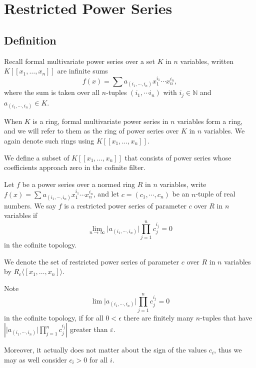 \chapter{Restricted Power Series}

\section{Definition}

Recall formal multivariate power series over a set $K$ in $n$ variables, written
$K [ \! [ x_1, \dots, x_n ] \! ]$ are infinite sums
\[
  f(x) = \sum a_{(i_1, \cdots, i_n)} x_1^{i_1} \cdots x_n^{i_n},
\]
where the sum is taken over all $n$-tuples $(i_1, \cdots i_n)$ with $i_j \in \mathbb{N}$ and
$a_{(i_1, \cdots, i_n)} \in K$.

When $K$ is a ring, formal multivariate power series in $n$ variables form a ring, and we will refer
to them as the ring of power series over $K$ in $n$ variables. We again denote such
rings using $K [ \! [ x_1, \dots, x_n ] \! ]$.

We define a subset of $K [ \! [ x_1, \dots, x_n ] \! ]$ that consists of power series whose
coefficients approach zero in the cofinite filter.

\begin{definition}
  Let $f$ be a power series over a normed ring $R$ in $n$ variables, write
  $f(x) = \sum a_{(i_1, \cdots, i_n)} x_1^{i_1} \cdots x_n^{i_n}$, and let
  $c = (c_1, \cdots, c_n)$ be an $n$-tuple of real numbers.
  We say $f$ is a restricted power series of parameter $c$ over $R$ in $n$ variables if
  \[
    \lim_{n \to \infty} \lvert a_{(i_1, \cdots, i_n)} \rvert \prod_{j=1}^{n} c_j^{i_j} = 0
  \]
  in the cofinite topology.

  We denote the set of restricted power series of parameter $c$ over $R$ in $n$ variables by
  $R_c \langle \! [ x_1, \dots, x_n ] \! \rangle$.
\end{definition}

\begin{remark}
  Note
  \[
    \lim \lvert a_{(i_1, \cdots, i_n)} \rvert \prod_{j=1}^{n} c_j^{i_j} = 0
  \]
  in the cofinite topology, if for all $0 < \epsilon$ there are finitely many $n$-tuples that have
  $\left \lvert \lvert a_{(i_1, \cdots, i_n)} \rvert \prod_{j=1}^{n} c_j^{i_j} \right \rvert$
  greater than $\varepsilon$.
\end{remark}

Moreover, it actually does not matter about the sign of the values $c_i$, thus we may as well consider
$c_i > 0$ for all $i$.

